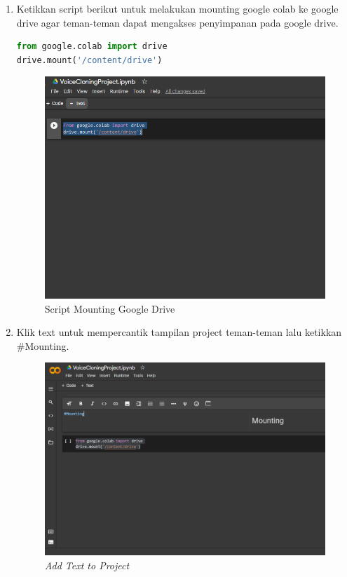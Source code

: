 \begin{enumerate}
\item Ketikkan script berikut untuk melakukan mounting google colab ke google drive agar teman-teman dapat mengakses penyimpanan pada google drive.
\begin{lstlisting}[language=Python, caption=Mounting Google Drive]
from google.colab import drive
drive.mount('/content/drive')
\end{lstlisting}

\begin{figure}[H]
    \centering
    \includegraphics[scale=0.5]{figures/colab3}
    \caption{Script Mounting Google Drive}
    \label{colab3}
\end{figure}

\item Klik text untuk mempercantik tampilan project teman-teman lalu ketikkan \#Mounting.
\begin{figure}[H]
    \centering
    \includegraphics[scale=0.4]{figures/colab4}
    \caption{\textit{Add Text to Project}}
    \label{colab4}
\end{figure}


\end{enumerate}
